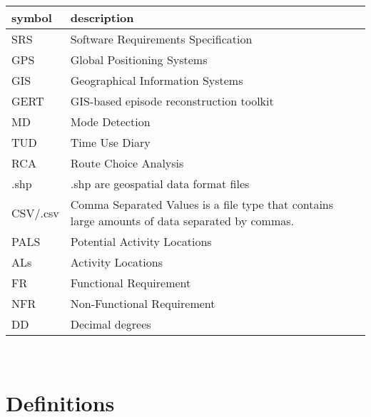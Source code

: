 \documentclass[12pt, titlepage]{article}
\begin{document}
\renewcommand{\arraystretch}{1.1}
\begin{tabular}{l p{10cm}} 
  \toprule		
  \textbf{symbol} & \textbf{description}\\
  \midrule 
  SRS & Software Requirements Specification \\
  GPS & Global Positioning Systems\\
  GIS & Geographical Information Systems\\
  GERT & GIS-based episode reconstruction toolkit \\
  MD & Mode Detection \\
  TUD & Time Use Diary\\
  RCA &   Route Choice Analysis \\
  .shp & .shp are geospatial data format files\\
  CSV/.csv & Comma Separated Values is a file type that contains large amounts of data separated by commas. \\
  PALS& Potential Activity Locations \\
  ALs & Activity Locations \\
  FR & Functional Requirement \\
  NFR & Non-Functional Requirement \\
  DD & Decimal degrees\\
  \bottomrule
\end{tabular}\\

\section{Definitions}
\end{document}
